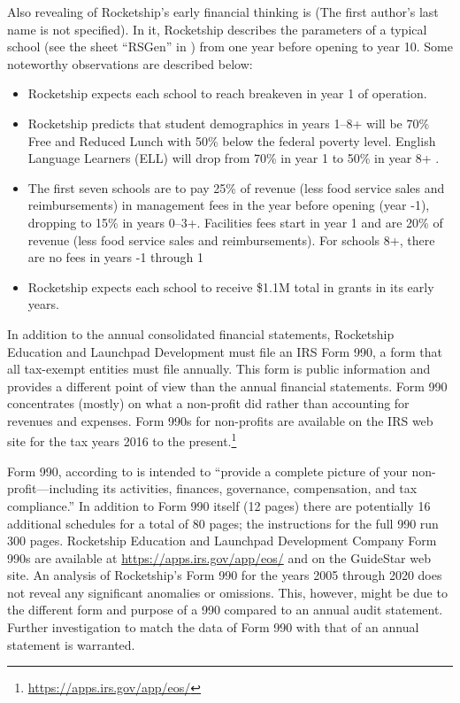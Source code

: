 Also revealing of Rocketship's early financial thinking is  \parencite{FinNarr2010} (The first author's last name is not specified). In it, Rocketship describes the parameters of a typical school (see the sheet ``RSGen'' in \textcite{RSED2009a}) from one year before opening to year 10. Some noteworthy observations are described below:
\begin{itemize}
  \item Rocketship expects each school to reach breakeven in year 1 of operation. \parencite[1]{FinNarr2010}
  \item Rocketship predicts that student demographics in years 1–8+ will be 70\% Free and Reduced Lunch with 50\% below the federal poverty level. English Language Learners (ELL) will drop from 70\% in year 1 to 50\% in year 8+ \parencite[1]{FinNarr2010}.
  \item The first seven schools are to pay 25\% of revenue (less food service sales and reimbursements) in management fees in the year before opening (year -1), dropping to 15\% in years 0–3+. Facilities fees start in year 1 and are 20\% of revenue (less food service sales and reimbursements). For schools 8+, there are no fees in years -1 through 1
  \item Rocketship expects each school to receive \$1.1M total in grants in its early years.
\end{itemize}

In addition to the annual consolidated financial statements, Rocketship Education and Launchpad Development must file an IRS Form 990, a form that all tax-exempt entities must file annually. This form is  public information and provides a different point of view than the annual financial statements. Form 990 concentrates (mostly) on what a non-profit did rather than accounting for revenues and expenses. Form 990s for non-profits are available on the IRS web site for the tax years 2016 to the present.\footnote{\url{https://apps.irs.gov/app/eos/}}

Form 990, according to \citeauthor{Fishman2022} is intended to ``provide a complete picture of your non-profit—including its activities, finances, governance, compensation, and tax compliance.'' \parencite[84]{Fishman2022} In addition to Form 990 itself (12 pages) there are potentially 16 additional schedules for a total of 80 pages; the instructions for the full 990 run 300 pages. Rocketship Education and Launchpad Development Company Form 990s are available at \url{https://apps.irs.gov/app/eos/} and on the GuideStar web site. An analysis of Rocketship's Form 990 for the years 2005 through 2020 does not reveal any significant anomalies or omissions. This, however, might be due to the different form and purpose of a 990 compared to an annual audit statement. Further investigation to match the data of Form 990 with that of an annual statement is warranted.

